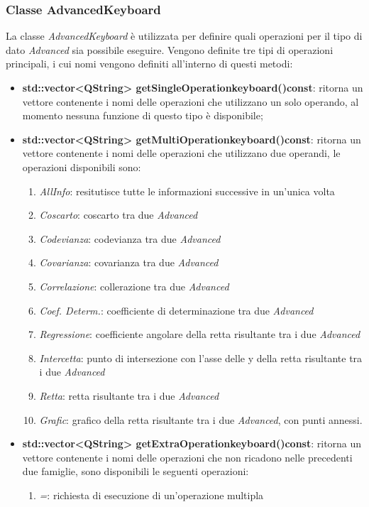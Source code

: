 \documentclass[a4paper,10pt]{article}
\begin{document}
    \subsubsection{Classe AdvancedKeyboard}
    La classe \textit{AdvancedKeyboard} è utilizzata per definire quali operazioni per il tipo di dato \textit{Advanced} sia possibile eseguire.
    Vengono definite tre tipi di operazioni principali, i cui nomi vengono definiti all'interno di questi metodi:
    \begin{itemize}
        \item \textbf{std::vector<QString> getSingleOperationkeyboard()const}: ritorna un vettore contenente i nomi delle operazioni che utilizzano un solo operando, al momento nessuna funzione di questo tipo è disponibile;
        \item \textbf{std::vector<QString> getMultiOperationkeyboard()const}: ritorna un vettore contenente i nomi delle operazioni che utilizzano due operandi, le operazioni disponibili sono:
        \begin{enumerate}
            \item \textit{AllInfo}: resitutisce tutte le informazioni successive in un'unica volta
            \item \textit{Coscarto}: coscarto tra due \textit{Advanced}
            \item \textit{Codevianza}: codevianza tra due \textit{Advanced}
            \item \textit{Covarianza}: covarianza tra due \textit{Advanced}
            \item \textit{Correlazione}: collerazione tra due \textit{Advanced}
            \item \textit{Coef. Determ.}: coefficiente di determinazione tra due \textit{Advanced}
            \item \textit{Regressione}: coefficiente angolare della retta risultante tra i due \textit{Advanced}
            \item \textit{Intercetta}: punto di intersezione con l'asse delle y della retta risultante tra i due \textit{Advanced}
            \item \textit{Retta}: retta risultante tra i due \textit{Advanced}
            \item \textit{Grafic}: grafico della retta risultante tra i due \textit{Advanced}, con punti annessi.
        \end{enumerate}
        \item \textbf{std::vector<QString> getExtraOperationkeyboard()const}: ritorna un vettore contenente i nomi delle operazioni che non ricadono nelle precedenti due famiglie, sono disponibili le seguenti operazioni:
        \begin{enumerate}
            \item \textit{=}: richiesta di esecuzione di un'operazione multipla
        \end{enumerate}
    \end{itemize}
\end{document}
